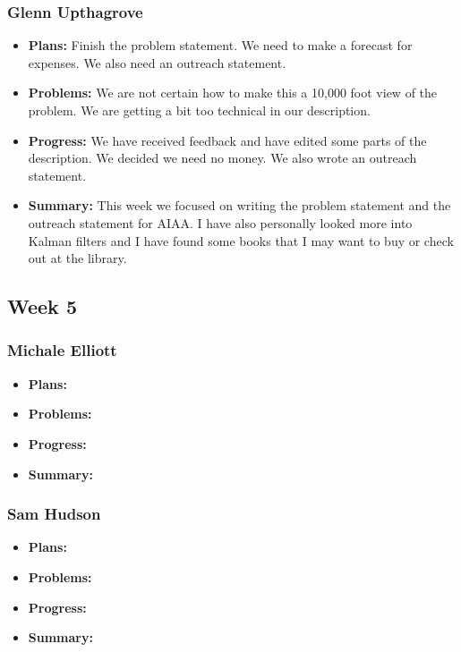 \documentclass[onecolumn, draftclsnofoot,10pt, compsoc]{IEEEtran}
\begin{document}
\subsubsection{Glenn Upthagrove}
\begin {itemize}
 \item \textbf{Plans: }Finish the problem statement. We need to make a forecast for expenses. We also need an outreach statement. 
 \item \textbf{Problems: }We are not certain how to make this a 10,000 foot view of the problem. We are getting a bit too technical in our description. 
 \item \textbf{Progress: }We have received feedback and have edited some parts of the description. We decided we need no money. We also wrote an outreach statement. 
 \item \textbf{Summary: }This week we focused on writing the problem statement and the outreach statement for AIAA. I have also personally looked more into Kalman filters and I have found some books that I may want to buy or check out at the library.  
\end {itemize}
\subsection {Week 5}
\subsubsection{Michale Elliott}
\begin {itemize}
 \item \textbf{Plans: }
 \item \textbf{Problems: }
 \item \textbf{Progress: }
 \item \textbf{Summary: }
\end {itemize}
\subsubsection{Sam Hudson}
\begin {itemize}
 \item \textbf{Plans: }
 \item \textbf{Problems: }
 \item \textbf{Progress: }
 \item \textbf{Summary: }
\end {itemize}
\end{document}
